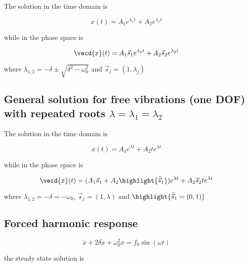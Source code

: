 \documentclass[10pt,a4paper]{scrartcl}
\begin{document}
\begin{multicols*}{2}
The solution in the time domain is

\begin{equation*}
x(t)=A_1e^{\lambda_1 t}+A_2e^{\lambda_2 t}
\end{equation*}

while in the phase space is

\begin{equation*}
\vecd{x}(t)=A_1\vec{s}_1e^{\lambda_1 t}+A_2\vec{s}_2e^{\lambda_2 t}
\end{equation*}

where $\lambda_{1,2}=-\delta\pm\sqrt{\delta^2-\omega_0^2}$ and $\vec{s}_j=(1,\lambda_j)$


\subsection{General solution for free vibrations (one DOF) with repeated roots $\lambda= \lambda_1=\lambda_2$}
The solution in the time domain is

\begin{equation*}
x(t)=A_1e^{\lambda t}+A_2te^{\lambda t}
\end{equation*}

while in the phase space is

\begin{equation*}
\vecd{x}(t)=(A_1\vec{s}_1+A_2\highlight{\tilde{\vec{s}}_1})e^{\lambda t}+A_2\vec{s}_2te^{\lambda t}
\end{equation*}

where $\lambda_{1,2}=-\delta = -\omega_0$, $\vec{s}_j=(1,\lambda)$ and $\highlight{\tilde{\vec{s}}_1=(0,1)}$


\subsection{Forced harmonic response}

\begin{equation*}
\ddot{x}+2\delta\dot{x}+\omega_0^2x=f_0\sin(\omega t)
\end{equation*}

the steady state solution is


\end{multicols*}
\end{document}
